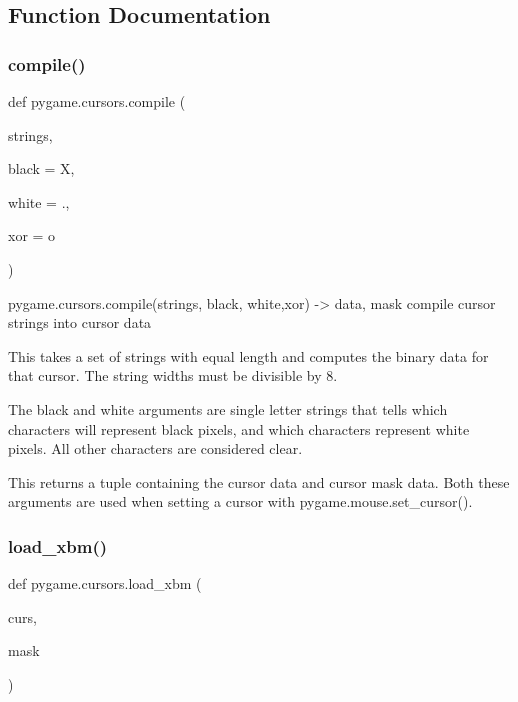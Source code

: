 \subsection{Function Documentation}
\mbox{\label{namespacepygame_1_1cursors_a19f38a01d13e77f591209869d99d99e5}} 
\subsubsection{\texorpdfstring{compile()}{compile()}}
{\footnotesize\ttfamily def pygame.\+cursors.\+compile (\begin{DoxyParamCaption}\item[{}]{strings,  }\item[{}]{black = {\ttfamily \textquotesingle{}X\textquotesingle{}},  }\item[{}]{white = {\ttfamily \textquotesingle{}.\textquotesingle{}},  }\item[{}]{xor = {\ttfamily \textquotesingle{}o\textquotesingle{}} }\end{DoxyParamCaption})}

\begin{DoxyVerb}pygame.cursors.compile(strings, black, white,xor) -> data, mask
compile cursor strings into cursor data

This takes a set of strings with equal length and computes
the binary data for that cursor. The string widths must be
divisible by 8.

The black and white arguments are single letter strings that
tells which characters will represent black pixels, and which
characters represent white pixels. All other characters are
considered clear.

This returns a tuple containing the cursor data and cursor mask
data. Both these arguments are used when setting a cursor with
pygame.mouse.set_cursor().
\end{DoxyVerb}
 \mbox{\label{namespacepygame_1_1cursors_a2a84c8676fb5765acdb5556d7bf9ca22}} 
\subsubsection{\texorpdfstring{load\+\_\+xbm()}{load\_xbm()}}
{\footnotesize\ttfamily def pygame.\+cursors.\+load\+\_\+xbm (\begin{DoxyParamCaption}\item[{}]{curs,  }\item[{}]{mask }\end{DoxyParamCaption})}

